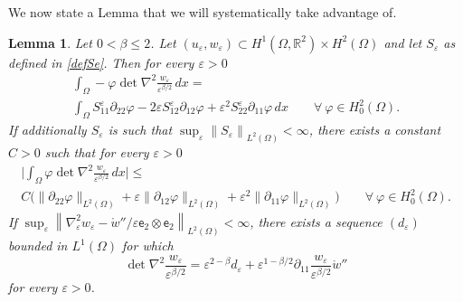 \documentclass[a4, 11pt, reqno, final]{amsart}
\newcommand{\bbR}{\mathbb{R}}
\newcommand{\n}[1]{\left\|#1\right\|}  %
\newcommand\e{\varepsilon}
\theoremstyle{plain}%
\newtheorem{lemma}[theorem]{Lemma}
\begin{document}
	We now state a Lemma that we will systematically take advantage of.
	\begin{lemma}\label{lemmaS} Let $0<\beta \le 2$.
		Let $(u_\e, w_{\e})\subset H^1(\Omega,\bbR^2)\times H^2(\Omega)$ and let $S_\e$ as defined in \eqref{defSe}.
		Then for every $\e>0$
		\begin{multline}\label{Seq}
			\int_\Omega -\varphi \det \nabla^2\frac{w_\e}{\e^{\beta/2}}\,dx = \\\int_\Omega S^\e_{11}\partial_{22}\varphi-2\e S^\e_{12}\partial_{12}\varphi+\e^2S^\e_{22}\partial_{11}\varphi\, dx
			 \qquad \forall \ \varphi\in H^2_0(\Omega).
		\end{multline}
		If additionally $S_\e$ is such that $\sup_\e\n{S_\e}_{L^2(\Omega)}<\infty$,  there exists a constant $C>0$ such that for every $\e>0$
		\begin{multline}\label{Sineq}
			\Big|\int_\Omega\varphi \det \nabla^2\frac{w_\e}{\e^{\beta/2}} \,dx\Big|\le \\ C\big(\|\partial_{22}\varphi\|_{L^2(\Omega)}+\e\|\partial_{12}\varphi\|_{L^2(\Omega)}+\e^2\|\partial_{11}\varphi\|_{L^2(\Omega)}\big) \qquad  \forall \ \varphi\in H^2_0(\Omega).
		\end{multline}
		If $\sup_\e\n{\nabla_\e^2 w_\e - \mathring{w}''/\e \mathsf{e}_2\otimes\mathsf{e}_2}_{L^2(\Omega)}<\infty$, there exists a sequence $(d_\e)$ bounded in $L^1(\Omega)$ for which
		\begin{equation}\label{eqdet}
			\det \nabla^2\frac{w_\e}{\e^{\beta/2}}=\e^{2-\beta}d_\e+\e^{1-\beta/2}\partial_{11}\frac{w_\e}{\e^{\beta/2}}\mathring{w}''
		\end{equation}
		for every $\e>0$.
	\end{lemma}
\end{document}
